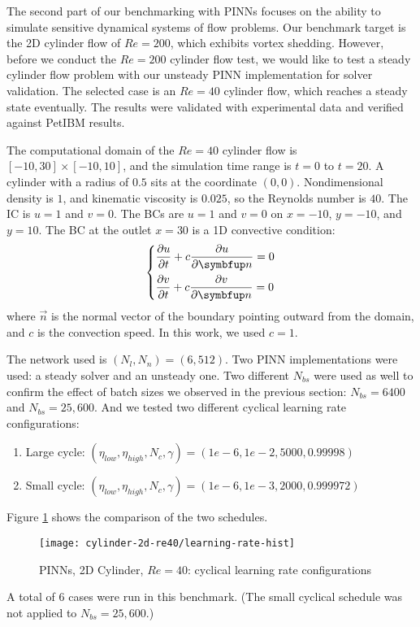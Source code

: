 The second part of our benchmarking with PINNs focuses on the ability to simulate sensitive dynamical systems of flow problems.
Our benchmark target is the 2D cylinder flow of $Re=200$, which exhibits vortex shedding.
However, before we conduct the $Re=200$ cylinder flow test, we would like to test a steady cylinder flow problem with our unsteady PINN implementation for solver validation.
The selected case is an $Re=40$ cylinder flow, which reaches a steady state eventually.
The results were validated with experimental data and verified against PetIBM results.

The computational domain of the $Re=40$ cylinder flow is $[-10, 30]\times[-10, 10]$, and the simulation time range is $t=0$ to $t=20$.
A cylinder with a radius of $0.5$ sits at the coordinate $(0, 0)$.
Nondimensional density is $1$, and kinematic viscosity is $0.025$, so the Reynolds number is $40$.
The IC is $u=1$ and $v=0$.
The BCs are $u=1$ and $v=0$ on $x=-10$, $y=-10$, and $y=10$.
The BC at the outlet $x=30$ is a 1D convective condition:
\begin{equation}\label{eq:convec-bc}
    \left\{
    \begin{aligned}
        &\pdiff{u}{t} + c\pdiff{u}{\vec{n}} = 0 \\
        &\pdiff{v}{t} + c\pdiff{v}{\vec{n}} = 0 \\
    \end{aligned}
    \right.
\end{equation}
where $\vec{n}$ is the normal vector of the boundary pointing outward from the domain, and $c$ is the convection speed.
In this work, we used $c=1$.

The network used is $(N_l, N_n)=(6, 512)$.
Two PINN implementations were used: a steady solver and an unsteady one.
Two different $N_{bs}$ were used as well to confirm the effect of batch sizes we observed in the previous section: $N_{bs}=6400$ and $N_{bs}=25,600$.
And we tested two different cyclical learning rate configurations:
\begin{enumerate}[nolistsep]
    \item Large cycle: $(\eta_{low}, \eta_{high}, N_c, \gamma)=(1e-6, 1e-2, 5000, 0.99998)$
    \item Small cycle: $(\eta_{low}, \eta_{high}, N_c, \gamma)=(1e-6, 1e-3, 2000, 0.999972)$
\end{enumerate}
Figure \ref{fig:cylinder-2d-re40-lr-hist} shows the comparison of the two schedules.
\begin{figure}[hbt!]
    \texttt{[image: cylinder-2d-re40/learning-rate-hist]}
    \caption[%
        PINNs, 2D Cylinder, $Re=40$: cyclical learning rate configurations%
    ]{%
        PINNs, 2D Cylinder, $Re=40$: cyclical learning rate configurations%
    }%
    \label{fig:cylinder-2d-re40-lr-hist}
\end{figure}
A total of 6 cases were run in this benchmark.
(The small cyclical schedule was not applied to $N_{bs}=25,600$.)

